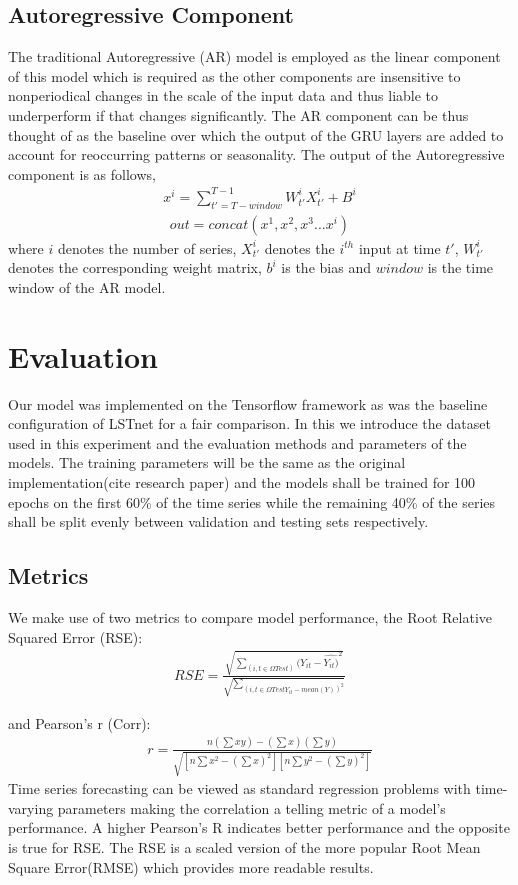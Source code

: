 \documentclass{article}
\begin{document}
\subsection{Autoregressive Component}
The traditional Autoregressive (AR) model is employed as the linear component of this model which is required as the other components are insensitive to nonperiodical changes in the scale of the input data and thus liable to underperform if that changes significantly. The AR component can be thus thought of as the baseline over which the output of the GRU layers are added to account for reoccurring patterns or seasonality. The output of the Autoregressive component is as follows,
\begin{align}
x^i = \sum_{t'=T-window}^{T-1} W_{t'}^{i} X_{t'}^{i} +B^{i} 
\end{align}
\begin{align}
out = concat(x^1,x^2,x^3...x^i) 
\end{align}
where $i$ denotes the number of series, $X_{t'}^{i}$ denotes the $i^{th}$ input at time $t'$, $W_{t'}^{i}$ denotes the corresponding weight matrix, $b^i$ is the bias and $window$ is the time window of the AR model.
 
\section{Evaluation}
Our model was implemented on the Tensorflow framework as was the baseline configuration of LSTnet for a fair comparison. In this we introduce the dataset used in this experiment and the evaluation methods and parameters of the models. The training parameters will be the same as the original implementation(cite research paper) and the models shall be trained for 100 epochs on the first 60\% of the time series while the remaining 40\% of the series shall be split evenly between validation and testing sets respectively.

\subsection{Metrics}
We make use of two metrics to compare model performance, the Root Relative Squared Error (RSE):
\begin{align}
RSE = \frac{\sqrt{\sum_{(i,t\in\Omega Test)}(Y_{it}-\hat{Y_{it})}^2}}{\sqrt{\sum_{(i,t\in\Omega Test Y_{it}-mean(Y))^2}}}
\end{align}

and Pearson's r (Corr):
\begin{align}
r = \frac{n(\sum xy) - (\sum x)(\sum y)}{\sqrt{[n\sum x^2-(\sum x)^2][n \sum y^2-(\sum y)^2]}}
\end{align}
Time series forecasting can be viewed as standard regression problems with time-varying parameters making the correlation a telling metric of a model's performance\cite{kim2003financial, cao2003support}. A higher Pearson's R indicates better performance and the opposite is true for RSE. The RSE is a scaled version of the more popular Root Mean Square Error(RMSE) which provides more readable results. 
\end{document}
